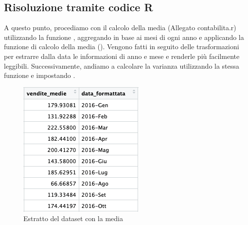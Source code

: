 \subsection{Risoluzione tramite codice R}
A questo punto, procediamo con il calcolo della media (Allegato contabilita.r) utilizzando la funzione , aggregando in base ai mesi di ogni anno e applicando la funzione di calcolo della media (). Vengono fatti in seguito delle trasformazioni per estrarre dalla data le informazioni di anno e mese e renderle più facilmente leggibili. Successivamente, andiamo a calcolare la varianza utilizzando la stessa funzione  e impostando .


\begin{figure}[ht]
\centering
\begin{minipage}{.3\textwidth}
    \centering
    \includegraphics[width=\linewidth]{img/media_r.png}
    \caption{Estratto del dataset con la media}
    \label{fig:immagine1}
\end{minipage}
\begin{minipage}{.3\textwidth}
    \centering
    \end{minipage}
\begin{minipage}{.3\textwidth}

\end{minipage}
\end{figure}
